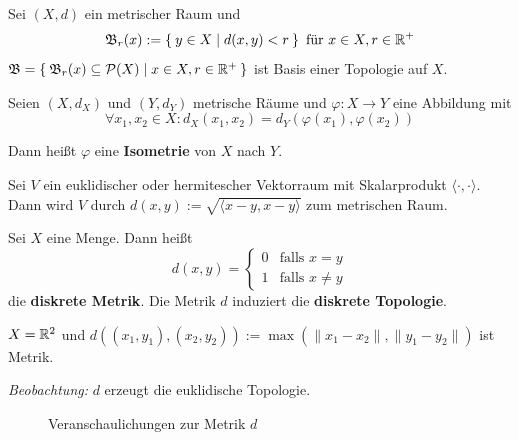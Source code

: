 \begin{bemerkung}
    Sei $(X, d)$ ein metrischer Raum und
    \[\mathfrak{B}_r(x) := \Set{y \in X | d(x,y) < r} \text{ für } x \in X, r \in \mathbb{R}^+\]
    $\mathfrak{B} = \Set{\mathfrak{B}_r(x) \subseteq \mathcal{P}(X) | x \in X, r \in \ensuremath{\mathbb{R}}^+}$ ist Basis einer Topologie auf $X$.
\end{bemerkung}

\begin{definition}\label{def:Isometrie}%
    Seien $(X, d_X)$ und $(Y, d_Y)$ metrische Räume und $\varphi: X \rightarrow Y$
    eine Abbildung mit 
    \[\forall x_1, x_2 \in X: d_X(x_1, x_2) = d_Y(\varphi(x_1), \varphi(x_2)) \]

    Dann heißt $\varphi$ eine \textbf{Isometrie} von $X$ nach $Y$.
\end{definition}

\begin{beispiel}
    Sei $V$ ein euklidischer oder hermitescher Vektorraum mit Skalarprodukt
    $\langle \cdot , \cdot \rangle$.
    Dann wird $V$ durch $d(x,y) := \sqrt{\langle x-y, x-y \rangle}$ zum metrischen Raum.
\end{beispiel}

\begin{beispiel}%
    Sei $X$ eine Menge. Dann heißt
    \[d(x,y) = \begin{cases}
    0 & \text{falls } x=y\\
    1 & \text{falls } x \neq y
    \end{cases}\]
    die \textbf{diskrete Metrik}. Die Metrik $d$ induziert die 
    \textbf{diskrete Topologie}.
\end{beispiel}

\begin{beispiel}
    $X = \mathbb{R}^2$ und $d\left ((x_1, y_1), (x_2, y_2)\right ) := \max(\|x_1 - x_2\|, \|y_1 - y_2\|)$
    ist Metrik.

    \emph{Beobachtung:} $d$ erzeugt die euklidische Topologie.

    \begin{figure}[ht]
        \centering
        \subfloat[$\fB_r(0)$]{
            
            \label{fig:open-square}
        }%
        \label{fig:metrik}
        \caption{Veranschaulichungen zur Metrik $d$}
    \end{figure}

\end{beispiel}

